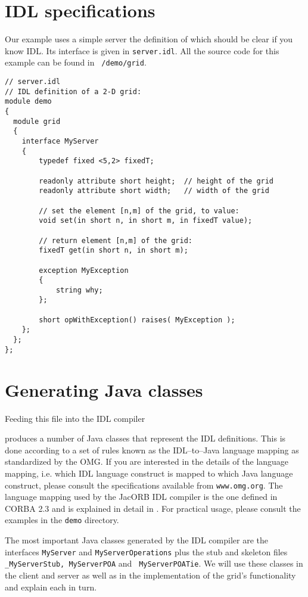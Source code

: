 \documentclass[12pt]{scrbook}
\begin{document}
\section{IDL specifications}

Our example uses a simple server the definition of which should be
clear if you know IDL. Its interface is given in {\tt server.idl}. All
the source code for this example can be found in {\tt
  \JacORBDir/demo/grid}.

\small{
\begin{verbatim}
// server.idl
// IDL definition of a 2-D grid:
module demo
{
  module grid
  {
    interface MyServer
    {
        typedef fixed <5,2> fixedT;

        readonly attribute short height;  // height of the grid
        readonly attribute short width;   // width of the grid

        // set the element [n,m] of the grid, to value:
        void set(in short n, in short m, in fixedT value);

        // return element [n,m] of the grid:
        fixedT get(in short n, in short m);

        exception MyException
        {
            string why;
        };

        short opWithException() raises( MyException );
    };
  };
};
\end{verbatim}
}

\section{Generating Java classes}

Feeding this file into the IDL compiler


produces a number of Java  classes that represent the IDL definitions.
This is  done according to a  set of rules known  as the IDL--to--Java
language mapping as standardized by  the OMG. If you are interested in
the details of the language mapping, i.e. which IDL language construct
is  mapped  to  which  Java  language construct,  please  consult  the
specifications available from  {\tt www.omg.org}. The language mapping
used by the JacORB IDL compiler is the one defined in CORBA 2.3 and is
explained in detail in  \cite{Brose2001a}. For practical usage, please
consult the examples in the {\tt demo} directory.

The most important Java classes  generated by the IDL compiler are the
interfaces {\tt  MyServer} and {\tt MyServerOperations}  plus the stub
and  skeleton   files  {\tt  \_MyServerStub,   MyServerPOA}  and  {\tt
MyServerPOATie}.  We will  use these classes in the  client and server
as  well as  in the  implementation  of the  grid's functionality  and
explain each in turn.
\end{document}
